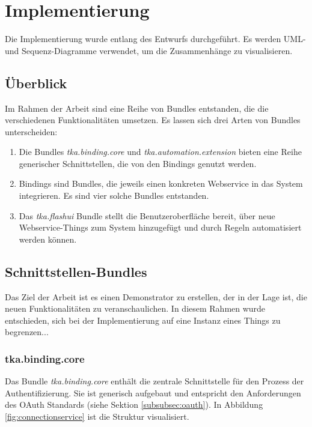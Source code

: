 \chapter{Implementierung}
Die Implementierung wurde entlang des Entwurfs durchgeführt. Es werden UML- und
Sequenz-Diagramme verwendet, um die Zusammenhänge zu visualisieren.

\section{Überblick}
Im Rahmen der Arbeit sind eine Reihe von Bundles entstanden, die die verschiedenen Funktionalitäten umsetzen. Es lassen sich drei Arten von Bundles unterscheiden:
\begin{enumerate}
\item Die Bundles \textit{tka.binding.core} und \textit{tka.automation.extension} bieten eine Reihe generischer Schnittstellen, die von den Bindings genutzt werden.
\item Bindings sind Bundles, die jeweils einen konkreten Webservice in das System integrieren. Es sind vier solche Bundles entstanden.
\item Das \textit{tka.flashui} Bundle stellt die Benutzeroberfläche bereit, über neue Webservice-Things zum System hinzugefügt und durch Regeln automatisiert werden können.
\end{enumerate}


\section{Schnittstellen-Bundles}
Das Ziel der Arbeit ist es einen Demonstrator zu erstellen, der in der Lage ist, die neuen Funktionalitäten zu veranschaulichen. In diesem Rahmen wurde entschieden, sich bei der Implementierung auf eine Instanz eines Things zu begrenzen...



\subsection{tka.binding.core}
Das Bundle \textit{tka.binding.core} enthält die zentrale Schnittstelle für den Prozess der Authentifizierung. Sie ist generisch aufgebaut und entspricht den Anforderungen des OAuth Standards (siehe Sektion \ref{subsubsec:oauth}). In Abbildung \ref{fig:connectionservice} ist die Struktur visualisiert.

